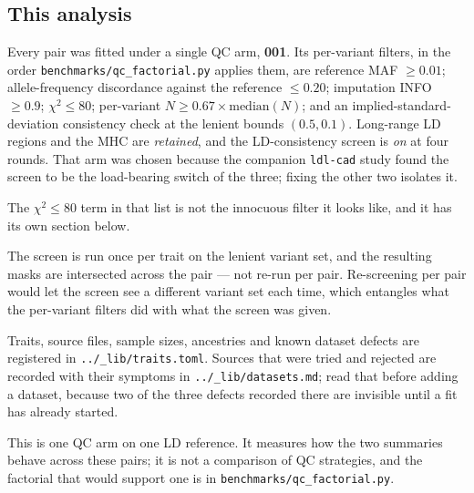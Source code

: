 \subsection*{This analysis}

Every pair was fitted under a single QC arm, \textbf{001}. Its per-variant
filters, in the order \texttt{benchmarks/qc\_factorial.py} applies them, are
reference MAF $\geq 0.01$; allele-frequency discordance against the reference
$\leq 0.20$; imputation INFO $\geq 0.9$; $\chi^2 \leq 80$; per-variant $N \geq
0.67 \times \mathrm{median}(N)$; and an implied-standard-deviation consistency
check at the lenient bounds $(0.5, 0.1)$. Long-range LD regions and the MHC are
\emph{retained}, and the LD-consistency screen is \emph{on} at four rounds.
That arm was chosen because the companion \texttt{ldl-cad} study found the
screen to be the load-bearing switch of the three; fixing the other two
isolates it.

The $\chi^2 \leq 80$ term in that list is not the innocuous filter it looks
like, and it has its own section below.

The screen is run once per trait on the lenient variant set, and the resulting
masks are intersected across the pair --- not re-run per pair. Re-screening per
pair would let the screen see a different variant set each time, which entangles
what the per-variant filters did with what the screen was given.

Traits, source files, sample sizes, ancestries and known dataset defects are
registered in \texttt{../\_lib/traits.toml}. Sources that were tried and
rejected are recorded with their symptoms in \texttt{../\_lib/datasets.md}; read
that before adding a dataset, because two of the three defects recorded there
are invisible until a fit has already started.

This is one QC arm on one LD reference. It measures how the two summaries
behave across these pairs; it is not a comparison of QC strategies, and the
factorial that would support one is in \texttt{benchmarks/qc\_factorial.py}.
